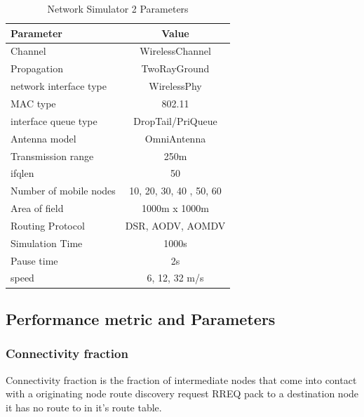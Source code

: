 \documentclass[letterpaper, 10 pt, conference]{ieeeconf}  %
\begin{document}
\begin{table}[h!bt]
\caption{Network Simulator 2 Parameters}
\centering
\begin{tabular}{|l|c|}
    \hline    
	\textbf{Parameter} & \textbf{Value} \\
	\hline
	Channel & WirelessChannel \\
	\hline
    Propagation & TwoRayGround\\
	\hline
  network interface type & WirelessPhy \\
	\hline    
	MAC type & 802.11\\
	\hline
    interface queue type & DropTail/PriQueue\\
	\hline
    Antenna model & OmniAntenna \\
	\hline
	Transmission range  & 250m \\
	\hline
    ifqlen & 50 \\
	\hline
    Number of mobile nodes & 10, 20, 30, 40 , 50, 60 \\
	\hline
    Area of field & 1000m x 1000m \\
	\hline
   Routing Protocol & DSR, AODV, AOMDV \\
	\hline
    Simulation Time & 1000s\\
	\hline    
	Pause time & 2s\\
	\hline
    speed & 6, 12, 32 m/s\\
	\hline

    
\end{tabular}

\label{table:2}

\end{table}



\subsection{Performance metric and Parameters}



\subsubsection{Connectivity fraction}
Connectivity fraction is the fraction of intermediate nodes that come into contact with a originating node route discovery request RREQ pack to a destination node it has no route to in it's route table.
\end{document}
